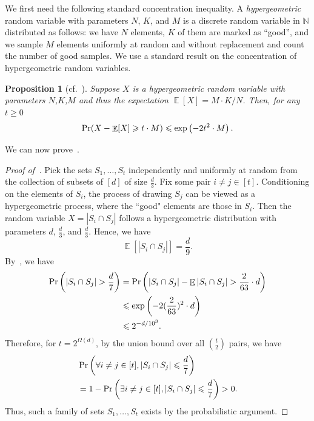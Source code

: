 \documentclass[11pt]{article}
\newtheorem{proposition}[lemma]{Proposition}
\theoremstyle{definition}
\renewcommand{\leq}{\leqslant}
\renewcommand{\geq}{\geqslant}
\newcommand{\IN}{\ensuremath{\mathbb{N}}}
\DeclareMathOperator*{\Exp}{\ensuremath{{\mathbb{E}}}}
\DeclareMathOperator*{\Prob}{\ensuremath{\textnormal{Pr}}}
\renewcommand{\Pr}{\Prob}
\begin{document}
We first need the following standard concentration inequality. A \emph{hypergeometric} random variable with parameters $N$, $K$, and $M$ is a discrete random variable
in $\IN$ distributed as follows: we have $N$ elements, $K$ of them are marked as ``good'', and we sample
$M$ elements uniformly at random and without replacement and count the number of good samples.
We use a standard result on the concentration of hypergeometric random variables.


\begin{proposition}[cf.~{\cite[Theorem 2.10]{JansonLR11}}]\label{prop:hypergeometric-concentration-ineq}
    Suppose $X$ is a hypergeometric random variable with parameters $N$,$K$,$M$ and thus the expectation $\Exp[X] = M\cdot K/N$. Then, for any $t\geq 0$    
    \[
    \Pr(X - \Exp[X] \geq t\cdot M) \leq \exp \left(-2t^2\cdot M \right).
    \]
\end{proposition}

We can now prove~. 

\begin{proof}[Proof of~]
    Pick the sets $S_1, \ldots, S_t$ independently and uniformly at random from the collection of subsets of $[d]$ of size $\frac{d}{3}$. Fix some pair $i \ne j \in [t]$. Conditioning on the elements of $S_i$, the process of drawing $S_j$ can be viewed as a hypergeometric process, where the ``good" elements are those in $S_i$. 
	Then the random variable $X = \left|S_i \cap S_j\right|$ follows a hypergeometric distribution with parameters $d$, $\frac{d}{3}$, and $\frac{d}{3}$. Hence, we have
	$$\Exp[\left|S_i\cap S_j\right|]=\frac{d}{9}.$$
	By~, we have
	\begin{align*}
		\Pr\left(\left|S_i\cap S_j\right|>\frac{d}{7}\right)
		&=\Pr\left(\left|S_i\cap S_j\right| - \Exp{\left|S_i\cap S_j\right|} > \frac{2}{63}\cdot d \right)\\
		&\leq \exp\left(-2(\frac{2}{63})^2\cdot d\right)\\
		&\leq 2^{-d/10^3}.
	\end{align*}
	Therefore, for $t = 2^{\Omega(d)}$, by the union bound over all $\binom{t}{2}$ pairs, we have
	\begin{align*}
		&\Pr\left(\forall i\ne j\in[t], \left|S_i\cap S_j\right|\leq \frac{d}{7} \right)\\
		&=1-\Pr\left(\exists i\ne j\in[t], \left|S_i\cap S_j\right|\leq \frac{d}{7} \right) >0.
	\end{align*}
	Thus, such a family of sets $S_1, \ldots, S_t$ exists by the probabilistic argument.
\end{proof}
\end{document}
